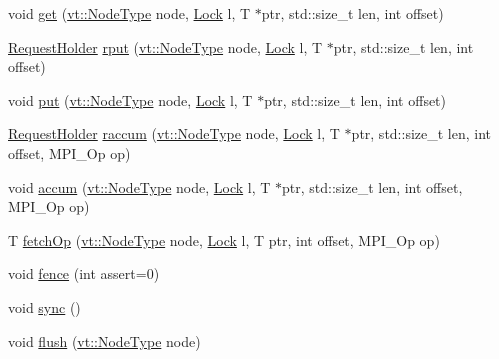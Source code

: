 \begin{DoxyCompactItemize}
\item 
void \hyperlink{structvt_1_1rdma_1_1_holder_a065715e0c91be9b411b490b740fc064a}{get} (\hyperlink{namespacevt_a866da9d0efc19c0a1ce79e9e492f47e2}{vt\+::\+Node\+Type} node, \hyperlink{namespacevt_1_1rdma_ac5c20b41a653e520b6305d4d454ecb70}{Lock} l, T $\ast$ptr, std\+::size\+\_\+t len, int offset)
\item 
\hyperlink{structvt_1_1rdma_1_1_request_holder}{Request\+Holder} \hyperlink{structvt_1_1rdma_1_1_holder_ae3f9105ec3abe794bd39f24ef55f1c29}{rput} (\hyperlink{namespacevt_a866da9d0efc19c0a1ce79e9e492f47e2}{vt\+::\+Node\+Type} node, \hyperlink{namespacevt_1_1rdma_ac5c20b41a653e520b6305d4d454ecb70}{Lock} l, T $\ast$ptr, std\+::size\+\_\+t len, int offset)
\item 
void \hyperlink{structvt_1_1rdma_1_1_holder_ad6edaae632bb4025e8d29f27abfcf81c}{put} (\hyperlink{namespacevt_a866da9d0efc19c0a1ce79e9e492f47e2}{vt\+::\+Node\+Type} node, \hyperlink{namespacevt_1_1rdma_ac5c20b41a653e520b6305d4d454ecb70}{Lock} l, T $\ast$ptr, std\+::size\+\_\+t len, int offset)
\item 
\hyperlink{structvt_1_1rdma_1_1_request_holder}{Request\+Holder} \hyperlink{structvt_1_1rdma_1_1_holder_a1d1abbaaad0d2490b01b10493fe78e36}{raccum} (\hyperlink{namespacevt_a866da9d0efc19c0a1ce79e9e492f47e2}{vt\+::\+Node\+Type} node, \hyperlink{namespacevt_1_1rdma_ac5c20b41a653e520b6305d4d454ecb70}{Lock} l, T $\ast$ptr, std\+::size\+\_\+t len, int offset, M\+P\+I\+\_\+\+Op op)
\item 
void \hyperlink{structvt_1_1rdma_1_1_holder_affd535937b2b5e3bd243e4cae43d779e}{accum} (\hyperlink{namespacevt_a866da9d0efc19c0a1ce79e9e492f47e2}{vt\+::\+Node\+Type} node, \hyperlink{namespacevt_1_1rdma_ac5c20b41a653e520b6305d4d454ecb70}{Lock} l, T $\ast$ptr, std\+::size\+\_\+t len, int offset, M\+P\+I\+\_\+\+Op op)
\item 
T \hyperlink{structvt_1_1rdma_1_1_holder_a21514973be4a2a9107be043fe727d9f0}{fetch\+Op} (\hyperlink{namespacevt_a866da9d0efc19c0a1ce79e9e492f47e2}{vt\+::\+Node\+Type} node, \hyperlink{namespacevt_1_1rdma_ac5c20b41a653e520b6305d4d454ecb70}{Lock} l, T ptr, int offset, M\+P\+I\+\_\+\+Op op)
\item 
void \hyperlink{structvt_1_1rdma_1_1_holder_ae0131450f2f087c80faa444810aa25ed}{fence} (int assert=0)
\item 
void \hyperlink{structvt_1_1rdma_1_1_holder_a85d338b1beb4c041aa477b18c4eaa312}{sync} ()
\item 
void \hyperlink{structvt_1_1rdma_1_1_holder_af2bb524d70bdaa0eaad2a394c0e9b633}{flush} (\hyperlink{namespacevt_a866da9d0efc19c0a1ce79e9e492f47e2}{vt\+::\+Node\+Type} node)

\end{DoxyCompactItemize}
